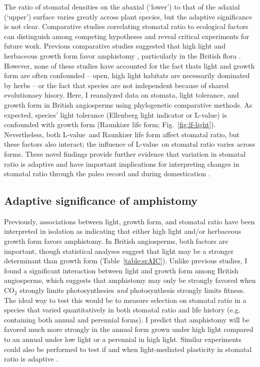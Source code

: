 \documentclass[12pt, oneside]{article}
\newcommand{\el}{L-value}
\begin{document}
The ratio of stomatal densities on the abaxial (`lower') to that of the adaxial (`upper') surface varies greatly across plant species, but the adaptive significance is not clear. Comparative studies correlating stomatal ratio to ecological factors can distinguish among competing hypotheses and reveal critical experiments for future work. Previous comparative studies suggested that high light and herbaceous growth form favor amphistomy \citep{Mott_etal_1982, Jordan_etal_2014, Muir_2015, Bucher_etal_2017}, particularly in the British flora \citep{Salisbury_1927, Peat_Fitter_1994b}. However, none of these studies have accounted for the fact thats light and growth form are often confounded -- open, high light habitats are necessarily dominated by herbs -- or the fact that species are not independent because of shared evolutionaey hisory. Here, I reanalyzed data on stomata, light tolerance, and growth form in British angiosperms using phylogenetic comparative methods. As expected, species' light tolerance (Ellenberg light indicator or \el) is confounded with growth form (Raunki\ae r life form; Fig.~\ref{fig:lf-light}). Nevertheless, both \el~and Raunki\ae r life form affect stomatal ratio, but these factors also interact; the influence of \el~on stomatal ratio varies across forms. These novel findings provide further evidence that variation in stomatal ratio is adaptive and have important implications for interpreting changes in stomatal ratio through the paleo record \citep{Jordan_etal_2014} and during domestication \citep{Milla_etal_2013}.

\subsection*{Adaptive significance of amphistomy}

Previously, associations between light, growth form, and stomatal ratio have been interpreted in isolation as indicating that either high light and/or herbaceous growth form favors amphistomy. In British angiosperms, both factors are important, though statistical analyses suggest that light may be a stronger determinant than growth form (Table~\ref{table:srAIC}). Unlike previous studies, I found a significant interaction between light and growth form among British angiosperms, which suggests that amphistomy may only be strongly favored when CO$_2$ strongly limits photosynthesies \textit{and} photosynthesis strongly limits fitness. The ideal way to test this would be to measure selection on stomatal ratio in a species that varied quantitatively in both stomatal ratio and life history (e.g. containing both annual and perennial forms). I predict that amphistomy will be favored much more strongly in the annual form grown under high light compared to an annual under low light or a perennial in high light. Similar experiments could also be performed to test if and when light-mediated plasticity in stomatal ratio is adaptive \citep{Gay_Hurd_1975, Mott_Michaelson_1991}.
\end{document}
